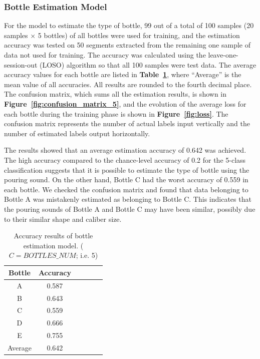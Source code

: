 \documentclass[sigconf,authordraft]{acmart}
\newcommand\figref[1]{\textbf{Figure~\ref{fig:#1}}}
\newcommand\tabref[1]{\textbf{Table~\ref{tab:#1}}}
\begin{document}
\subsubsection{Bottle Estimation Model}
For the model to estimate the type of bottle, 99 out of a total of 100 samples (20 samples $\times$ 5 bottles) of all bottles were used for training, and the estimation accuracy was tested on 50 segments extracted from the remaining one sample of data not used for training. The accuracy was calculated using the leave-one-session-out (LOSO) algorithm so that all 100 samples were test data. The average accuracy values for each bottle are listed in \tabref{result_5}, where ``Average'' is the mean value of all accuracies. All results are rounded to the fourth decimal place. The confusion matrix, which sums all the estimation results, is shown in \figref{confusion_matrix_5}, and the evolution of the average loss for each bottle during the training phase is shown in \figref{loss}. The confusion matrix represents the number of actual labels input vertically and the number of estimated labels output horizontally.\par

The results showed that an average estimation accuracy of 0.642 was achieved. The high accuracy compared to the chance-level accuracy of 0.2 for the 5-class classification suggests that it is possible to estimate the type of bottle using the pouring sound. On the other hand, Bottle C had the worst accuracy of 0.559 in each bottle. We checked the confusion matrix and found that data belonging to Bottle A was mistakenly estimated as belonging to Bottle C. This indicates that the pouring sounds of Bottle A and Bottle C may have been similar, possibly due to their similar shape and caliber size.

\begin{table}[!t]
  \centering
  \caption{Accuracy results of bottle estimation model. ($C=BOTTLES\_NUM$; i.e. 5)}
  \begin{tabular}{c|ccccc} \hline\hline
    Bottle & Accuracy \\ \hline
    A & 0.587 \\
    B & 0.643 \\
    C & 0.559 \\
    D & 0.666 \\
    E & 0.755 \\ \hline
    Average & 0.642 \\ \hline
  \end{tabular}
  \label{tab:result_5}
\end{table}
\end{document}

